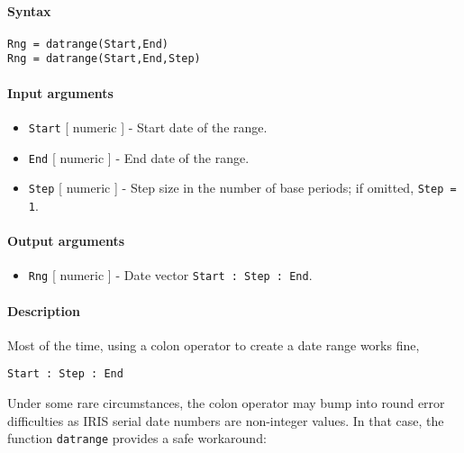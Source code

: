 


	\paragraph{Syntax}

\begin{verbatim}
Rng = datrange(Start,End)
Rng = datrange(Start,End,Step)
\end{verbatim}

\paragraph{Input arguments}

\begin{itemize}
\item
  \texttt{Start} {[} numeric {]} - Start date of the range.
\item
  \texttt{End} {[} numeric {]} - End date of the range.
\item
  \texttt{Step} {[} numeric {]} - Step size in the number of base
  periods; if omitted, \texttt{Step = 1}.
\end{itemize}

\paragraph{Output arguments}

\begin{itemize}
\itemsep1pt\parskip0pt
\item
  \texttt{Rng} {[} numeric {]} - Date vector
  \texttt{Start : Step : End}.
\end{itemize}

\paragraph{Description}

Most of the time, using a colon operator to create a date range works
fine,

\begin{verbatim}
Start : Step : End
\end{verbatim}

Under some rare circumstances, the colon operator may bump into round
error difficulties as IRIS serial date numbers are non-integer values.
In that case, the function \texttt{datrange} provides a safe workaround:

